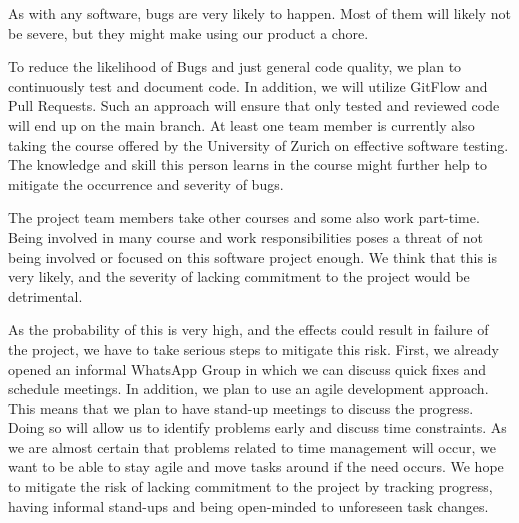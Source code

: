 \documentclass[11pt]{article}
\begin{document}
\begin{tcolorbox}[title=\textbf{Bad Code Quality and Bugs}, sharp corners, colframe=MaterialRed600, colback=MaterialRed100, coltitle=white]
\begin{description}[noitemsep]
\item[Risk:] As with any software, bugs are very likely to happen. Most of them will likely not be severe, but they might make using our product a chore.
\item[Probability:] <4>
\item[Severity:] <3>
\item[Risk exposure:] <12>
\item[Mitigation:] To reduce the likelihood of Bugs and just general code quality, we plan to continuously test and document code. In addition, we will utilize GitFlow and Pull Requests. Such an approach will ensure that only tested and reviewed code will end up on the main branch. At least one team member is currently also taking the course offered by the University of Zurich on effective software testing. The knowledge and skill this person learns in the course might further help to mitigate the occurrence and severity of bugs.
\end{description}
\end{tcolorbox}

\begin{tcolorbox}[title=\textbf{Lack of Commitment to the project due to other responsibilities and Time Constraints}, sharp corners, colframe=MaterialRed600, colback=MaterialRed100, coltitle=white]
\begin{description}[noitemsep]
\item[Risk:] The project team members take other courses and some also work part-time. Being involved in many course and work responsibilities poses a threat of not being involved or focused on this software project enough. We think that this is very likely, and the severity of lacking commitment to the project would be detrimental.
\item[Probability:] <4>
\item[Severity:] <4>
\item[Risk exposure:] <16>
\item[Mitigation:] As the probability of this is very high, and the effects could result in failure of the project, we have to take serious steps to mitigate this risk. First, we already opened an informal WhatsApp Group in which we can  discuss quick fixes and schedule meetings. In addition, we plan to use an agile development approach. This means that we plan to have stand-up meetings to  discuss the progress. Doing so will allow us to identify problems early and discuss time constraints. As we are almost certain that problems related to time management will occur, we want to be able to stay agile and move tasks around if the need occurs. We hope to mitigate the risk of lacking commitment to the project by tracking progress, having informal stand-ups and being open-minded to unforeseen task changes.
\end{description}
\end{tcolorbox}
\end{document}
